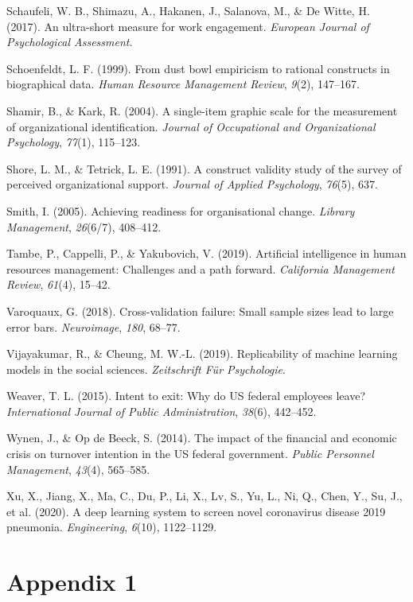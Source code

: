 \documentclass[
  man]{apa7}
\newlength{\cslhangindent}
\newlength{\cslentryspacingunit} %
\newenvironment{CSLReferences}[2] %
 {%
  \setlength{\parindent}{0pt}
  \ifodd #1
  \let\oldpar\par
  \def\par{\hangindent=\cslhangindent\oldpar}
  \fi
  \setlength{\parskip}{#2\cslentryspacingunit}
 }%
 {}
\begin{document}
\begin{CSLReferences}{1}{0}
\leavevmode{}%
Schaufeli, W. B., Shimazu, A., Hakanen, J., Salanova, M., \& De Witte, H. (2017). An ultra-short measure for work engagement. \emph{European Journal of Psychological Assessment}.

\leavevmode{}%
Schoenfeldt, L. F. (1999). From dust bowl empiricism to rational constructs in biographical data. \emph{Human Resource Management Review}, \emph{9}(2), 147--167.

\leavevmode{}%
Shamir, B., \& Kark, R. (2004). A single-item graphic scale for the measurement of organizational identification. \emph{Journal of Occupational and Organizational Psychology}, \emph{77}(1), 115--123.

\leavevmode{}%
Shore, L. M., \& Tetrick, L. E. (1991). A construct validity study of the survey of perceived organizational support. \emph{Journal of Applied Psychology}, \emph{76}(5), 637.

\leavevmode{}%
Smith, I. (2005). Achieving readiness for organisational change. \emph{Library Management}, \emph{26}(6/7), 408--412.

\leavevmode{}%
Tambe, P., Cappelli, P., \& Yakubovich, V. (2019). Artificial intelligence in human resources management: Challenges and a path forward. \emph{California Management Review}, \emph{61}(4), 15--42.

\leavevmode{}%
Varoquaux, G. (2018). Cross-validation failure: Small sample sizes lead to large error bars. \emph{Neuroimage}, \emph{180}, 68--77.

\leavevmode{}%
Vijayakumar, R., \& Cheung, M. W.-L. (2019). Replicability of machine learning models in the social sciences. \emph{Zeitschrift F{ü}r Psychologie}.

\leavevmode{}%
Weaver, T. L. (2015). Intent to exit: Why do US federal employees leave? \emph{International Journal of Public Administration}, \emph{38}(6), 442--452.

\leavevmode{}%
Wynen, J., \& Op de Beeck, S. (2014). The impact of the financial and economic crisis on turnover intention in the US federal government. \emph{Public Personnel Management}, \emph{43}(4), 565--585.

\leavevmode{}%
Xu, X., Jiang, X., Ma, C., Du, P., Li, X., Lv, S., Yu, L., Ni, Q., Chen, Y., Su, J., et al. (2020). A deep learning system to screen novel coronavirus disease 2019 pneumonia. \emph{Engineering}, \emph{6}(10), 1122--1129.

\end{CSLReferences}

\endgroup

\newpage

\hypertarget{appendix-1}{%
\section{Appendix 1}\label{appendix-1}}
\end{document}
